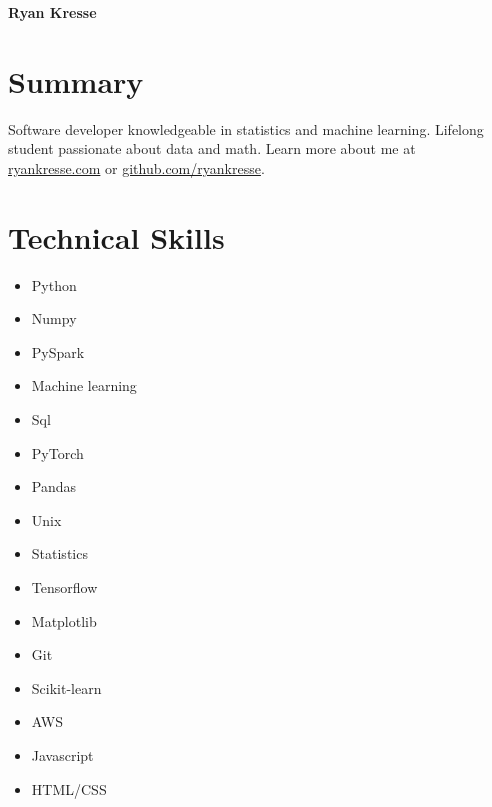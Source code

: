 \documentclass[11pt]{article}
\begin{document}
	
	\noindent \textbf{{\fontsize{38pt}{\parskip}\selectfont \color{RyanRed} Ryan Kresse}}
	\smallskip
	
	
	\section{Summary}
		Software developer knowledgeable in statistics and machine learning. Lifelong student passionate about data and math. Learn more about me at \href{http://ryankresse.com/blog}{ryankresse.com} or \href{https://github.com/ryankresse}{github.com/ryankresse}.	
	\section{Technical Skills}
		\begin{multicols}{4}
			\begin{itemize}
				\item Python 				
				\item Numpy				 
				\item PySpark
				\item Machine learning
				
				\columnbreak
				\item Sql 
				\item PyTorch
				\item Pandas 
				\item Unix 
				
				\columnbreak
				\item Statistics
				\item Tensorflow 
				\item Matplotlib			
				\item Git
				
							
				
				\columnbreak 
				\item Scikit-learn							
				
				\item AWS
				\item Javascript 
				\item HTML/CSS 
				
				 				
				\columnbreak 
				
			\end{itemize}
		\end{multicols}
	
\end{document}
